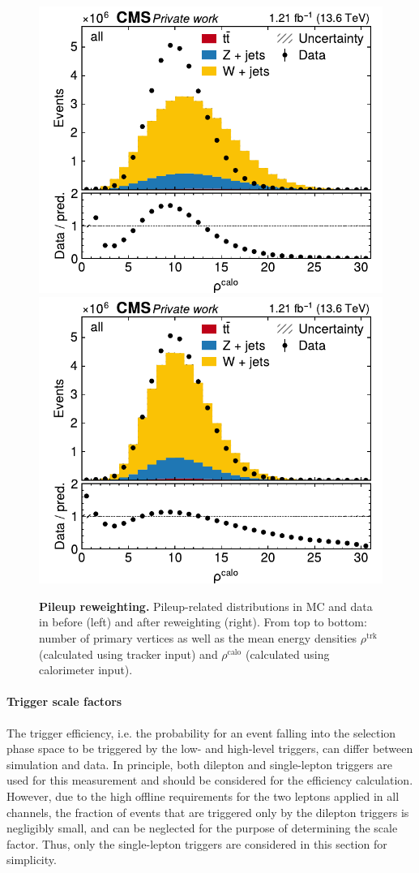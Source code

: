 \begin{figure}[p]
    \includegraphics[width=0.49 \textwidth]{figures/ttxs/pileup/rhoFastjetCentralCalo_orig.pdf}
    \hfill
    \includegraphics[width=0.49 \textwidth]{figures/ttxs/pileup/rhoFastjetCentralCalo_reweighted.pdf}
    \caption{\textbf{Pileup reweighting.} Pileup-related distributions in MC and data in before (left) and after reweighting (right). From top to bottom: number of primary vertices as well as the mean energy densities $\rho^{\mathrm{trk}}$ (calculated using tracker input) and $\rho^{\mathrm{calo}}$ (calculated using calorimeter input).}
    \label{fig:ttxs:pileup}
  \end{figure}

\paragraph{Trigger scale factors}

The trigger efficiency, i.e. the probability for an event falling into the selection phase space to be triggered by the low- and high-level triggers, can differ between simulation and data.
In principle, both dilepton and single-lepton triggers are used for this measurement and should be considered for the efficiency calculation. However, due to the high offline \pt requirements for the two leptons applied in all channels, the fraction of events that are triggered only by the dilepton triggers is negligibly small, and can be neglected for the purpose of determining the scale factor. Thus, only the single-lepton triggers are considered in this section for simplicity.

